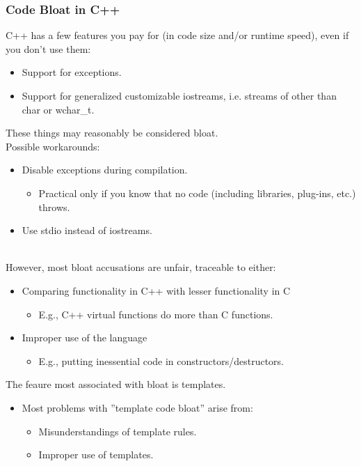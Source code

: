 \subsubsection{Code Bloat in C++}
C++ has a few features you pay for (in code size and/or runtime speed), even if you don't use them:
\begin{itemize}
  \item Support for exceptions.
  \item Support for generalized customizable iostreams, i.e. streams of other than char or wchar_t.
\end{itemize}
These things may reasonably be considered bloat.\\
Possible workarounds:
\begin{itemize}
  \item Disable exceptions during compilation.
  \begin{itemize}
    \item Practical only if you know that no code (including libraries, plug-ins, etc.) throws.
  \end{itemize}
  \item Use stdio instead of iostreams.
\end{itemize}\\
However, most bloat accusations are unfair, traceable to either:
\begin{itemize}
  \item Comparing functionality in C++ with lesser functionality in C
  \begin{itemize}
    \item E.g., C++ virtual functions do more than C functions.
  \end{itemize}
  \item Improper use of the language
  \begin{itemize}
    \item E.g., putting inessential code in constructors/destructors.
  \end{itemize}
\end{itemize}
The feaure most associated with bloat is templates.
\begin{itemize}
  \item Most problems with ''template code bloat'' arise from:
  \begin{itemize}
    \item Misunderstandings of template rules.
    \item Improper use of templates.
  \end{itemize}
\end{itemize}

